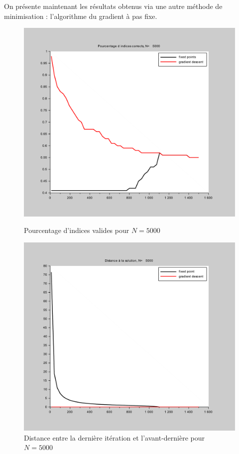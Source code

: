 \documentclass[10pt,a4paper]{article}
\begin{document}
On présente maintenant les résultats obtenus via une autre méthode de minimisation : l'algorithme du gradient à pas fixe. 
\begin{figure}[H]
\centering
\begin{minipage}[b]{.46\linewidth}
\centering
\includegraphics[scale=0.3]{compa_graddescent_105.pdf}
\caption{Pourcentage d'indices valides pour $N=5000$}
\end{minipage}
\begin{minipage}[b]{.46\linewidth}
\centering
\includegraphics[scale=0.3]{compa_graddescent_105_dist.pdf}
\caption{Distance entre la dernière itération et l'avant-dernière pour $N=5000$}
\end{minipage}
\end{figure}
\end{document}
